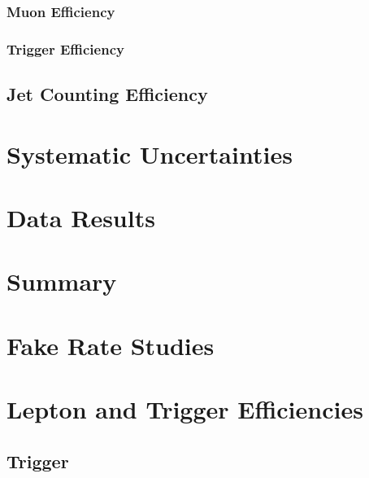 \documentclass{cmspaper}
\begin{document}
	 \subsubsection{Muon Efficiency}
	 \label{sec:eff_muon}
%	 
	 \subsubsection{Trigger Efficiency}
	 \label{sec:eff_trigger}
%	 
     \subsection{Jet Counting Efficiency}
%     

\section{Systematic Uncertainties}
   \label{sec:systematics}
%   

\clearpage
\section{Data Results}
   \label{sec:dataresults}
%   

\section{Summary}
     \label{sec:summary}
%     

\clearpage
%

\clearpage 
\appendix
\appendixpage
  \section{Fake Rate Studies}
     \label{app:fake_rate_studies}
 
\clearpage 
  \section{Lepton and Trigger Efficiencies}
     \label{app:efficiency_studies}
     \subsection{Trigger}
\end{document}
